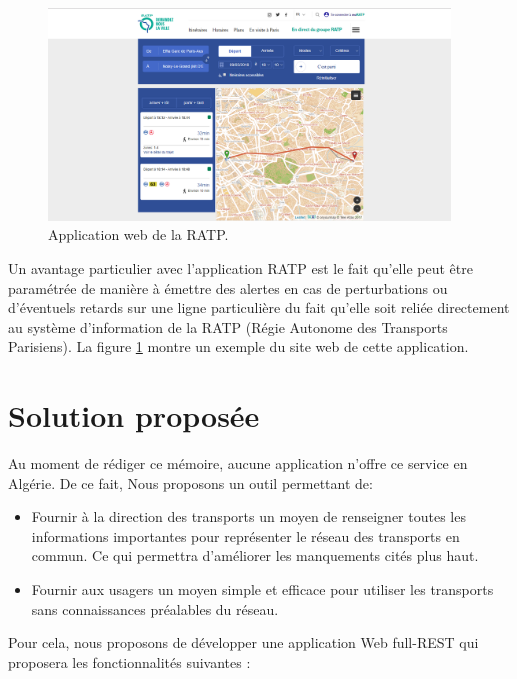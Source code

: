 \begin{figure}[h!]
	\center
	\includegraphics[width=0.95\textwidth]{img/ratp.png}
	\caption{Application web de la RATP.}
	\label{fig:RATP}
\end{figure}
Un avantage particulier avec l'application RATP est le fait qu'elle peut être paramétrée de manière à émettre des alertes en cas de perturbations ou d'éventuels retards sur une ligne particulière du fait qu'elle soit reliée directement au système d'information de la RATP (Régie Autonome des Transports Parisiens).
La figure \ref{fig:RATP} montre un exemple du site web de cette application.

\section{Solution proposée}
Au moment de rédiger ce mémoire, aucune application n'offre ce service en Algérie. \newline
De ce fait, Nous proposons un outil permettant de:
\begin{itemize}
	\item Fournir à la direction des transports un moyen de renseigner toutes les informations importantes pour représenter le réseau des transports en commun.\newline
	Ce qui permettra d'améliorer les manquements cités plus haut.
	\item Fournir aux usagers un moyen simple et efficace pour utiliser les transports sans connaissances préalables du réseau.\\
\end{itemize}
Pour cela, nous proposons de développer une application Web full-REST qui proposera les fonctionnalités suivantes : 

